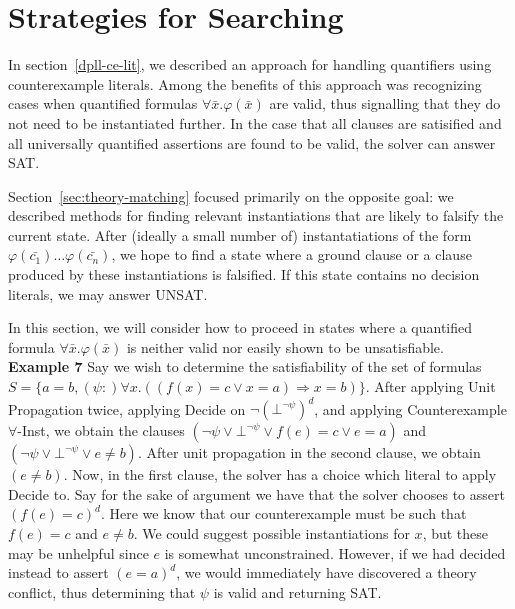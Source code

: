 \documentclass{llncs}
\begin{document}
\section{Strategies for Searching}

In section~\ref{dpll-ce-lit}, we described an approach for handling quantifiers using counterexample literals.
Among the benefits of this approach was recognizing cases when quantified formulas $\forall \bar{x}. \varphi( \bar{x} )$ are valid, thus signalling that they do not need to be instantiated further.
In the case that all clauses are satisified and all universally quantified assertions are found to be valid, the solver can answer SAT.

Section~\ref{sec:theory-matching} focused primarily on the opposite goal: we described methods for finding relevant instantiations that are likely to falsify the current state.
After (ideally a small number of) instantatiations of the form $\varphi( \bar{c_1} ) \ldots \varphi( \bar{c_n} )$, we hope to find a state where a ground clause or a clause produced by these instantiations is falsified.
If this state contains no decision literals, we may answer UNSAT.

In this section, we will consider how to proceed in states where a quantified formula $\forall \bar{x}. \varphi( \bar{x} )$ is neither valid nor easily shown to be unsatisfiable. \\

{\bf Example 7} 
Say we wish to determine the satisfiability of the set of formulas $S = \{ a = b, (\psi :) \forall x. ((f(x) = c \vee x = a) \Rightarrow x = b) \}$.
After applying Unit Propagation twice, applying Decide on $\neg (\bot^{ \neg \psi })^d$, and applying Counterexample $\forall$-Inst, we obtain the clauses $( \neg \psi \vee \bot^{ \neg \psi } \vee f(e) = c \vee e = a )$ and $( \neg \psi \vee \bot^{ \neg \psi } \vee e \neq b )$.
After unit propagation in the second clause, we obtain $( e \neq b )$.
Now, in the first clause, the solver has a choice which literal to apply Decide to.
Say for the sake of argument we have that the solver chooses to assert $( f(e) = c )^d$.
Here we know that our counterexample must be such that $f( e ) = c$ and $e \neq b$.
We could suggest possible instantiations for $x$, but these may be unhelpful since $e$ is somewhat unconstrained.
However, if we had decided instead to assert $( e = a )^d$, we would immediately have discovered a theory conflict, thus determining that $\psi$ is valid and returning SAT. \\
\end{document}
